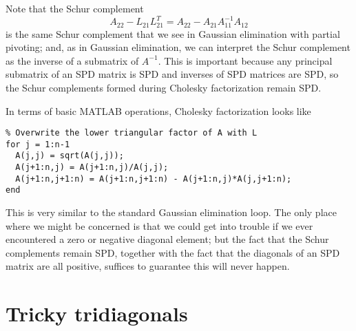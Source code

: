 \documentclass[12pt, leqno]{article}
\begin{document}
Note that the Schur complement
\[
  A_{22}-L_{21} L_{21}^T = A_{22} - A_{21} A_{11}^{-1} A_{12}
\]
is the same Schur complement that we see in Gaussian elimination
with partial pivoting; and, as in Gaussian elimination, we can
interpret the Schur complement as the inverse of a submatrix
of $A^{-1}$.  This is important because any principal submatrix of
an SPD matrix is SPD and inverses of SPD matrices are SPD, so
the Schur complements formed during Cholesky factorization remain
SPD.

In terms of basic MATLAB operations, Cholesky factorization looks like
\begin{lstlisting}
% Overwrite the lower triangular factor of A with L
for j = 1:n-1
  A(j,j) = sqrt(A(j,j));  
  A(j+1:n,j) = A(j+1:n,j)/A(j,j);
  A(j+1:n,j+1:n) = A(j+1:n,j+1:n) - A(j+1:n,j)*A(j,j+1:n);
end
\end{lstlisting}
This is very similar to the standard Gaussian elimination loop.
The only place where we might be concerned is that we could get
into trouble if we ever encountered a zero or negative diagonal
element; but the fact that the Schur complements remain SPD, together
with the fact that the diagonals of an SPD matrix are all positive,
suffices to guarantee this will never happen.

\section*{Tricky tridiagonals}
\end{document}
